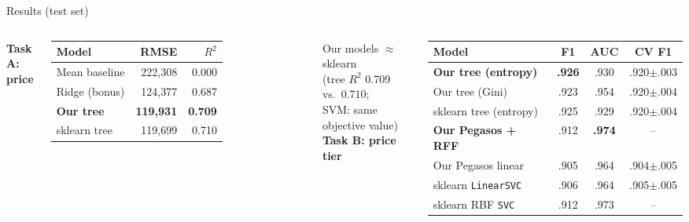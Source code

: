 \documentclass[aspectratio=169,11pt]{beamer}
\begin{document}
\begin{frame}{Results (test set)}
  \begin{columns}[T]
    \textbf{Task A: price}\\[0.3em]
    \small
    \begin{tabular}{@{}lrr@{}}
      \toprule
      Model & RMSE & $R^2$ \\
      \midrule
      Mean baseline & 222,308 & 0.000 \\
      Ridge (bonus) & 124,377 & 0.687 \\
      \textbf{Our tree} & \textbf{119,931} & \textbf{0.709} \\
      sklearn tree & 119,699 & 0.710 \\
      \bottomrule
    \end{tabular}
    \vspace{0.8em}

    \normalsize
    Our models $\approx$ sklearn\\
    (tree $R^2$ 0.709 vs.\ 0.710;\\
     SVM: same objective value)
    \textbf{Task B: price tier}\\[0.3em]
    \small
    \begin{tabular}{@{}lccc@{}}
      \toprule
      Model & F1 & AUC & CV F1 \\
      \midrule
      \textbf{Our tree (entropy)} & \textbf{.926} & .930 & .920$\pm$.003 \\
      Our tree (Gini) & .923 & .954 & .920$\pm$.004 \\
      sklearn tree (entropy) & .925 & .929 & .920$\pm$.004 \\
      \textbf{Our Pegasos + RFF} & .912 & \textbf{.974} & -- \\
      Our Pegasos linear & .905 & .964 & .904$\pm$.005 \\
      sklearn \texttt{LinearSVC} & .906 & .964 & .905$\pm$.005 \\
      sklearn RBF \texttt{SVC} & .912 & .973 & -- \\
      \bottomrule
    \end{tabular}
  \end{columns}
\end{frame}
\end{document}
